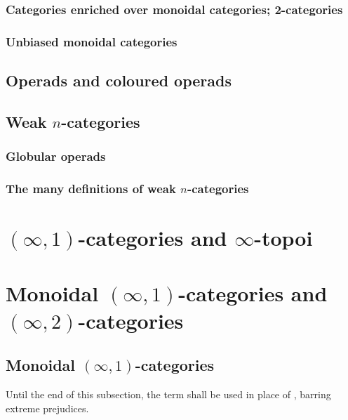             \subsubsection{Categories enriched over monoidal categories; 2-categories}
            
            \subsubsection{Unbiased monoidal categories}
        
        \subsection{Operads and coloured operads}
        
        \subsection{Weak \texorpdfstring{$n$}{}-categories}
            \subsubsection{Globular operads}
            
            \subsubsection{The many definitions of weak \texorpdfstring{$n$}{}-categories}
            
    \section{\texorpdfstring{$(\infty, 1)$}{}-categories and \texorpdfstring{$\infty$}{}-topoi}
    
    \section{Monoidal \texorpdfstring{$(\infty, 1)$}{}-categories and \texorpdfstring{$(\infty, 2)$}{}-categories}
        \subsection{Monoidal \texorpdfstring{$(\infty, 1)$}{}-categories}
            \begin{convention}
                Until the end of this subsection, the term  shall be used in place of , barring extreme prejudices.
            \end{convention}
        
